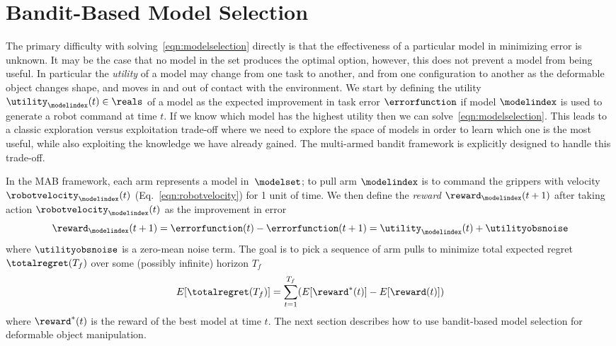 \section{Bandit-Based Model Selection}

The primary difficulty with solving~\eqref{eqn:modelselection} directly is that the effectiveness of a particular model in minimizing error is unknown. It may be the case that no model in the set produces the optimal option, however, this does not prevent a model from being useful. In particular the \textit{utility} of a model may change from one task to another, and from one configuration to another as the deformable object changes shape, and moves in and out of contact with the environment. We start by defining the utility $\utility_\modelindex(t) \in \reals$ of a model as the expected improvement in task error $\errorfunction$ if model $\modelindex$ is used to generate a robot command at time $t$. If we know which model has the highest utility then we can solve~\eqref{eqn:modelselection}. This leads to a classic exploration versus exploitation trade-off where we need to explore the space of models in order to learn which one is the most useful, while also exploiting the knowledge we have already gained.  The multi-armed bandit framework is explicitly designed to handle this trade-off.

In the MAB framework, each arm represents a model in~$\modelset$; to pull arm $\modelindex$ is to command the grippers with velocity $\robotvelocity_\modelindex(t)$ (Eq.~\ref{eqn:robotvelocity}) for 1 unit of time. We then define the \textit{reward} $\reward_\modelindex(t+1)$ after taking action $\robotvelocity_\modelindex(t)$ as the improvement in error
\begin{equation}
    \reward_\modelindex(t+1) = \errorfunction(t) - \errorfunction(t+1) = \utility_\modelindex(t) + \utilityobsnoise
    \label{eqn:observedreward}
\end{equation}
where $\utilityobsnoise$ is a zero-mean noise term. The goal is to pick a sequence of arm pulls to minimize total expected regret $\totalregret(T_f)$ over some (possibly infinite) horizon $T_f$
\begin{equation}
    E[\totalregret(T_f)] = \sum_{t=1}^{T_f} (E[\reward^*(t)] - E[\reward(t)])
    \label{eqn:totalregret}
\end{equation}
where $\reward^*(t)$ is the reward of the best model at time $t$. The next section describes how to use bandit-based model selection for deformable object manipulation.
